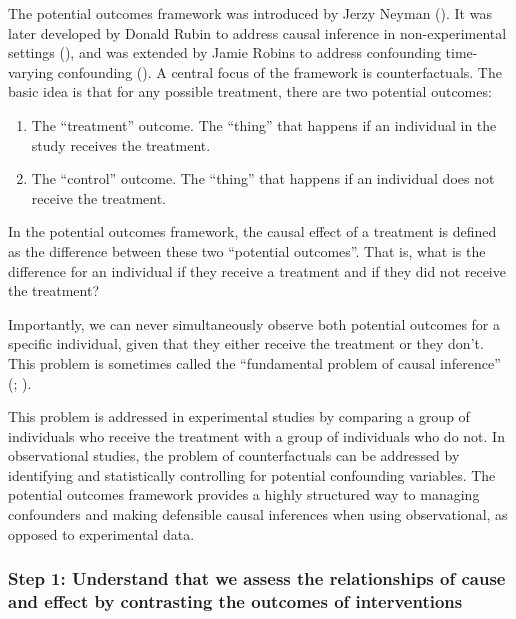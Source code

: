 \documentclass[
  singlecolumn]{article}
\providecommand{\tightlist}{%
  \setlength{\itemsep}{0pt}\setlength{\parskip}{0pt}}\usepackage{longtable,booktabs,array}
\begin{document}
The potential outcomes framework was introduced by Jerzy Neyman
(). It was later developed by
Donald Rubin to address causal inference in non-experimental settings
(), and was extended by Jamie Robins
to address confounding time-varying confounding
(). A central focus of the
framework is counterfactuals. The basic idea is that for any possible
treatment, there are two potential outcomes:

\begin{enumerate}
\def\labelenumi{\arabic{enumi}.}
\tightlist
\item
  The ``treatment'' outcome. The ``thing'' that happens if an individual
  in the study receives the treatment.
\item
  The ``control'' outcome. The ``thing'' that happens if an individual
  does not receive the treatment.
\end{enumerate}

In the potential outcomes framework, the causal effect of a treatment is
defined as the difference between these two ``potential outcomes''. That
is, what is the difference for an individual if they receive a treatment
and if they did not receive the treatment?

Importantly, we can never simultaneously observe both potential outcomes
for a specific individual, given that they either receive the treatment
or they don't. This problem is sometimes called the ``fundamental
problem of causal inference'' (;
).

This problem is addressed in experimental studies by comparing a group
of individuals who receive the treatment with a group of individuals who
do not. In observational studies, the problem of counterfactuals can be
addressed by identifying and statistically controlling for potential
confounding variables. The potential outcomes framework provides a
highly structured way to managing confounders and making defensible
causal inferences when using observational, as opposed to experimental
data.

\subsubsection{Step 1: Understand that we assess the relationships of
cause and effect by contrasting the outcomes of
interventions}\label{step-1-understand-that-we-assess-the-relationships-of-cause-and-effect-by-contrasting-the-outcomes-of-interventions}
\end{document}
